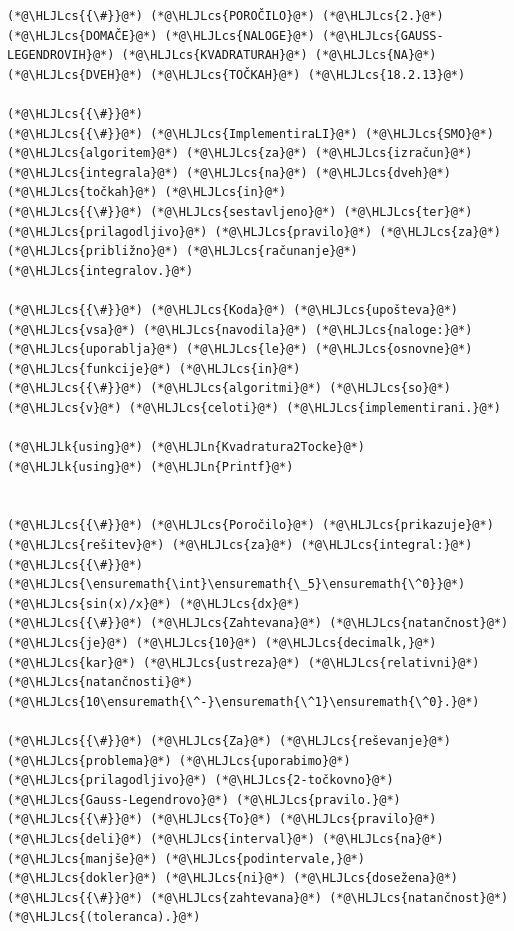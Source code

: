 \documentclass[12pt,a4paper]{article}
\newcommand{\HLJLk}[1]{\textcolor[RGB]{148,91,176}{\textbf{#1}}}
\newcommand{\HLJLn}[1]{#1}
\newcommand{\HLJLcs}[1]{\textcolor[RGB]{153,153,119}{\textit{#1}}}
\begin{document}
\begin{lstlisting}
(*@\HLJLcs{{\#}}@*) (*@\HLJLcs{POROČILO}@*) (*@\HLJLcs{2.}@*) (*@\HLJLcs{DOMAČE}@*) (*@\HLJLcs{NALOGE}@*) (*@\HLJLcs{GAUSS-LEGENDROVIH}@*) (*@\HLJLcs{KVADRATURAH}@*) (*@\HLJLcs{NA}@*) (*@\HLJLcs{DVEH}@*) (*@\HLJLcs{TOČKAH}@*) (*@\HLJLcs{18.2.13}@*)

(*@\HLJLcs{{\#}}@*) 
(*@\HLJLcs{{\#}}@*) (*@\HLJLcs{ImplementiraLI}@*) (*@\HLJLcs{SMO}@*) (*@\HLJLcs{algoritem}@*) (*@\HLJLcs{za}@*) (*@\HLJLcs{izračun}@*) (*@\HLJLcs{integrala}@*) (*@\HLJLcs{na}@*) (*@\HLJLcs{dveh}@*) (*@\HLJLcs{točkah}@*) (*@\HLJLcs{in}@*)
(*@\HLJLcs{{\#}}@*) (*@\HLJLcs{sestavljeno}@*) (*@\HLJLcs{ter}@*) (*@\HLJLcs{prilagodljivo}@*) (*@\HLJLcs{pravilo}@*) (*@\HLJLcs{za}@*) (*@\HLJLcs{približno}@*) (*@\HLJLcs{računanje}@*) (*@\HLJLcs{integralov.}@*)

(*@\HLJLcs{{\#}}@*) (*@\HLJLcs{Koda}@*) (*@\HLJLcs{upošteva}@*) (*@\HLJLcs{vsa}@*) (*@\HLJLcs{navodila}@*) (*@\HLJLcs{naloge:}@*) (*@\HLJLcs{uporablja}@*) (*@\HLJLcs{le}@*) (*@\HLJLcs{osnovne}@*) (*@\HLJLcs{funkcije}@*) (*@\HLJLcs{in}@*)
(*@\HLJLcs{{\#}}@*) (*@\HLJLcs{algoritmi}@*) (*@\HLJLcs{so}@*) (*@\HLJLcs{v}@*) (*@\HLJLcs{celoti}@*) (*@\HLJLcs{implementirani.}@*)

(*@\HLJLk{using}@*) (*@\HLJLn{Kvadratura2Tocke}@*)
(*@\HLJLk{using}@*) (*@\HLJLn{Printf}@*)


(*@\HLJLcs{{\#}}@*) (*@\HLJLcs{Poročilo}@*) (*@\HLJLcs{prikazuje}@*) (*@\HLJLcs{rešitev}@*) (*@\HLJLcs{za}@*) (*@\HLJLcs{integral:}@*)
(*@\HLJLcs{{\#}}@*) (*@\HLJLcs{\ensuremath{\int}\ensuremath{\_5}\ensuremath{\^0}}@*) (*@\HLJLcs{sin(x)/x}@*) (*@\HLJLcs{dx}@*)
(*@\HLJLcs{{\#}}@*) (*@\HLJLcs{Zahtevana}@*) (*@\HLJLcs{natančnost}@*) (*@\HLJLcs{je}@*) (*@\HLJLcs{10}@*) (*@\HLJLcs{decimalk,}@*) (*@\HLJLcs{kar}@*) (*@\HLJLcs{ustreza}@*) (*@\HLJLcs{relativni}@*) (*@\HLJLcs{natančnosti}@*) (*@\HLJLcs{10\ensuremath{\^-}\ensuremath{\^1}\ensuremath{\^0}.}@*)

(*@\HLJLcs{{\#}}@*) (*@\HLJLcs{Za}@*) (*@\HLJLcs{reševanje}@*) (*@\HLJLcs{problema}@*) (*@\HLJLcs{uporabimo}@*) (*@\HLJLcs{prilagodljivo}@*) (*@\HLJLcs{2-točkovno}@*) (*@\HLJLcs{Gauss-Legendrovo}@*) (*@\HLJLcs{pravilo.}@*)
(*@\HLJLcs{{\#}}@*) (*@\HLJLcs{To}@*) (*@\HLJLcs{pravilo}@*) (*@\HLJLcs{deli}@*) (*@\HLJLcs{interval}@*) (*@\HLJLcs{na}@*) (*@\HLJLcs{manjše}@*) (*@\HLJLcs{podintervale,}@*) (*@\HLJLcs{dokler}@*) (*@\HLJLcs{ni}@*) (*@\HLJLcs{dosežena}@*)
(*@\HLJLcs{{\#}}@*) (*@\HLJLcs{zahtevana}@*) (*@\HLJLcs{natančnost}@*) (*@\HLJLcs{(toleranca).}@*)


\end{lstlisting}
\end{document}
